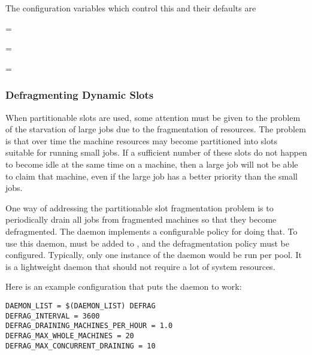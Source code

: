 The  configuration variables which control this 
and their defaults are

\begin{description}
  \item{ = }
  \item{ = }
  \item{ = }
\end{description}

\subsubsection{\label{sec:SMP-defrag}
Defragmenting Dynamic Slots}

When partitionable slots are used, some attention must be given to the
problem of the starvation of large jobs due to the fragmentation of resources.
The problem is that over time the machine resources may become
partitioned into slots suitable for running small jobs.
If a sufficient number of these slots do not happen to become idle at the
same time on a machine, then a large job will not be able to claim that
machine, even if the large job has a better priority than the small jobs.

One way of addressing the partitionable slot fragmentation problem is
to periodically drain all jobs from fragmented machines so that they
become defragmented.  
The  daemon implements a configurable policy for doing that.
To use this daemon,
 must be added to ,
and the defragmentation policy must be configured.
Typically, only one instance of the  daemon would be
run per pool.  
It is a lightweight daemon that should not require a lot of system resources.

Here is an example configuration that puts the  daemon to work:

\begin{verbatim}
DAEMON_LIST = $(DAEMON_LIST) DEFRAG
DEFRAG_INTERVAL = 3600
DEFRAG_DRAINING_MACHINES_PER_HOUR = 1.0
DEFRAG_MAX_WHOLE_MACHINES = 20
DEFRAG_MAX_CONCURRENT_DRAINING = 10
\end{verbatim}


